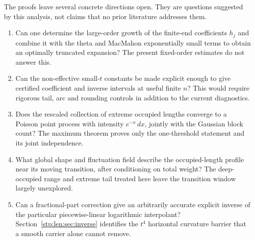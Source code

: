 \documentclass[11pt]{article}
\theoremstyle{remark}\newtheorem{remark}[theorem]{Remark}
\begin{document}
The proofs leave several concrete directions open. They are questions suggested by this analysis, not claims that no prior literature addresses them.
\begin{enumerate}
\item Can one determine the large-order growth of the finite-end coefficients $h_j$ and combine it with the theta and MacMahon exponentially small terms to obtain an optimally truncated expansion? The present fixed-order estimates do not answer this.
\item Can the non-effective small-$t$ constants be made explicit enough to give certified coefficient and inverse intervals at useful finite $n$? This would require rigorous tail, arc and rounding controls in addition to the current diagnostics.
\item Does the rescaled collection of extreme occupied lengths converge to a Poisson point process with intensity $e^{-x}\,dx$, jointly with the Gaussian block count? The maximum theorem proves only the one-threshold statement and its joint independence.
\item What global shape and fluctuation field describe the occupied-length profile near its moving transition, after conditioning on total weight? The deep-occupied range and extreme tail treated here leave the transition window largely unexplored.
\item Can a fractional-part correction give an arbitrarily accurate explicit inverse of the particular piecewise-linear logarithmic interpolant? Section~\ref{stp:len:sec:inverse} identifies the $t^4$ horizontal curvature barrier that a smooth carrier alone cannot remove.
\end{enumerate}
\end{document}
